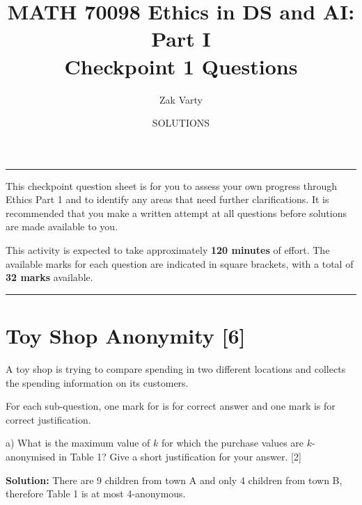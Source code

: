 \documentclass[a4paper, 11pt]{article}
\title{MATH 70098 Ethics in DS and AI: Part I \\ \textbf{Checkpoint 1 Questions}}
\author{Zak Varty}
\date{SOLUTIONS}
\begin{document}
\maketitle

\hrule

This checkpoint question sheet is for you to assess your own progress through Ethics Part 1 and to identify any areas that need further clarifications. It is recommended that you make a written attempt at all questions before solutions are made available to you.

This activity is expected to take approximately \textbf{120 minutes} of effort. The available marks for each question are indicated in square brackets, with a total of \textbf{32 marks} available.


\vspace{1em} 
 
\hrule

\section{Toy Shop Anonymity [6] }

A toy shop is trying to compare spending in two different locations and collects the spending information on its customers.

{\color{blue} For each sub-question, one mark for is for correct answer and one mark is for correct justification.}

a) What is the maximum value of $k$ for which the purchase values are $k$-anonymised in Table 1? Give a short justification for your answer. [2]

{\color{blue}
\textbf{Solution:} There are 9 children from town A and only 4 children from town B, therefore Table 1 is at most 4-anonymous.
}
\end{document}
